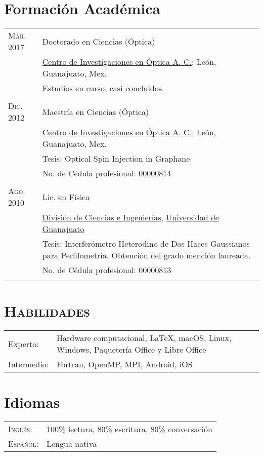 \documentclass[letterpaper,10pt]{article}
\begin{document}
\newpage
\section{Formaci\'on Acad\'emica}
\begin{tabular}{R{4cm}|p{11cm}}
\textsc{Mar. 2017 }	&	Doctorado en Ciencias (\'Optica) \\
						&	\href{http://www.cio.mx/}{Centro de Investigaciones en \'Optica A. C.}; Le\'on, Guanajuato, Mex.\\
						&	Estudios en curso, casi concluidos.\\
					 \\

\textsc{Dic. 2012 }	&	Maestr\'ia en Ciencias (\'Optica) \\
						&	\href{http://www.cio.mx/}{Centro de Investigaciones en \'Optica A. C.}; Le\'on, Guanajuato, Mex.\\
						&	Tesis: Optical Spin Injection in Graphane\\
						&	No. de C\'edula profesional: 00000814\\
					 \\

\textsc{Ago. 2010 }	&	Lic. en F\'isica \\
						&	\href{https://fisica.ugto.mx}{Divisi\'on de Ciencias e Ingenier\'ias}, \href{http://www.ugto.mx}{Universidad de Guanajuato}\\
						&	Tesis: Interfer\'ometro Heterodino de Dos Haces Gaussianos para Perfilometr\'ia. Obtenci\'on del grado menci\'on laureada.\\
						&	No. de C\'edula profesional: 00000813\\
					 \\
\end{tabular}

\section{\textsc{Habilidades}}
	\begin{tabular}{R{4cm} p{10cm}}
		Experto:	&	Hardware computacional, \LaTeX, macOS, Linux, Windows, Paqueter\'ia Office y Libre Office\\ 
		Intermedio:	&	Fortran, OpenMP, MPI, Android, iOS\\
	\end{tabular}

\section{Idiomas}
	\begin{tabular}{R{4cm}l}
		\textsc{Ingl\'es}:	&	100\% lectura, 80\% escritura, 80\% conversaci\'on \\
		\textsc{Espa\~nol}:	&	Lengua nativa \\
	\end{tabular}
\end{document}

